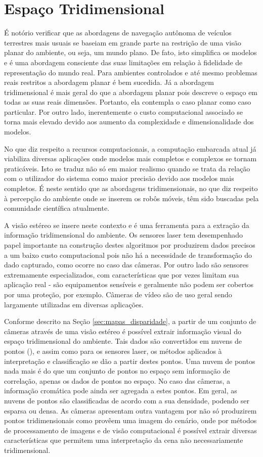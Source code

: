 \section{Espaço Tridimensional}

É notório verificar que as abordagens de navegação autônoma de veículos
terrestres mais usuais se baseiam em grande parte na restrição de uma visão
planar do ambiente, ou seja, um mundo plano. De fato, isto simplifica os modelos
e é uma abordagem consciente das suas limitações em relação à fidelidade de
representação do mundo real. Para ambientes controlados e até mesmo problemas
reais restritos a abordagem planar é bem sucedida. Já a abordagem tridimensional
é mais geral do que a abordagem planar pois descreve o espaço em todas as suas
reais dimensões. Portanto, ela contempla o caso planar como caso particular. Por
outro lado, inerentemente o custo computacional associado se torna mais elevado
devido aos aumento da complexidade e dimensionalidade dos modelos.

No que diz respeito a recursos computacionais, a computação embarcada atual já
viabiliza diversas aplicações onde modelos mais completos e complexos se tornam
praticáveis. Isto se traduz não só em maior realismo quando se trata da relação
com o utilizador do sistema como maior precisão devido aos modelos mais
completos. É neste sentido que as abordagens tridimensionais, no que diz
respeito à percepção do ambiente onde se inserem os robôs móveis, têm sido
buscadas pela comunidade científica atualmente.

A visão estéreo se insere neste contexto e é uma ferramenta para a extração da
informação tridimensional do ambiente. Os sensores laser tem desempenhado papel
importante na construção destes algoritmos por produzirem dados precisos a um
baixo custo computacional pois não há a necessidade de transformação do dado
capturado, como ocorre no caso das câmeras. Por outro lado são sensores
extremamente especializados, com características que por vezes limitam sua
aplicação real - são equipamentos sensíveis e geralmente não podem ser cobertos
por uma proteção, por exemplo. Câmeras de vídeo são de uso geral sendo
largamente utilizadas em diversas aplicações.

Conforme descrito na Seção \ref{sec:mapas_disparidade}, a partir de um conjunto
de câmeras através de uma visão estéreo é possível extrair informação visual do
espaço tridimensional do ambiente. Tais dados são convertidos em nuvens de
pontos (), e assim como para os sensores laser, os métodos
aplicados à interpretação e classificação se dão a partir destes pontos. Uma
nuvem de pontos nada mais é do que um conjunto de pontos no espaço sem
informação de correlação, apenas os dados de pontos no espaço. No caso das
câmeras, a informação cromática pode ainda ser agregada a estes pontos. Em
geral, as nuvens de pontos são classificadas de acordo com a sua densidade,
podendo ser esparsa ou densa. As câmeras apresentam outra vantagem por não só
produzirem pontos tridimensionais como provêem uma imagem do cenário, onde por
métodos de processamento de imagens e de visão computacional é possível extrair
diversas características que permitem uma interpretação da cena não
necessariamente tridimensional.

